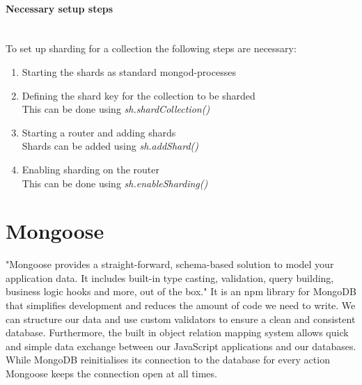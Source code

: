 \documentclass[11pt]{article}
\begin{document}
\paragraph{Necessary setup steps}\mbox{}\\
To set up sharding for a collection the following steps are necessary:

\begin{enumerate}
	\item Starting the shards as standard mongod-processes 
    \item Defining the shard key for the collection to be sharded \\
    This can be done using \textit{sh.shardCollection()}
    \item Starting a router and adding shards \\
    Shards can be added using \textit{sh.addShard()}
	\item Enabling sharding on the router \\
	This can be done using \textit{sh.enableSharding()}
\end{enumerate}
   


\section{Mongoose}
"Mongoose provides a straight-forward, schema-based solution to model your application data. It includes built-in type casting, validation, query building, business logic hooks and more, out of the box." \cite{mongooseintro} It is an npm library for MongoDB that simplifies development and reduces the amount of code we need to write. We can structure our data and use custom validators to ensure a clean and consistent database. Furthermore, the built in object relation mapping system allows quick and simple data exchange between our JavaScript applications and our databases. While MongoDB reinitialises its connection to the database for every action Mongoose keeps the connection open at all times. 
\end{document}
